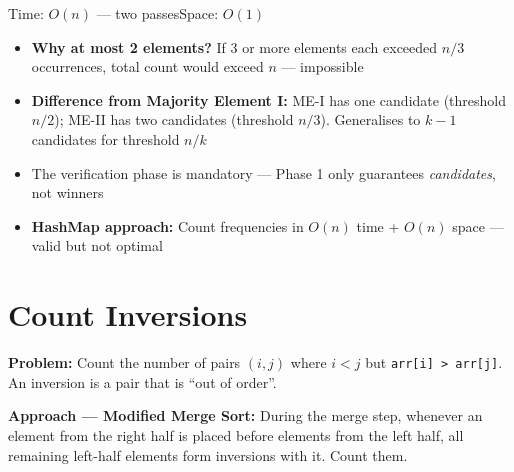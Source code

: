 \documentclass[12pt,a4paper,oneside]{book}
\begin{document}
\begin{complexity}
Time: $O(n)$ --- two passes\quad Space: $O(1)$
\end{complexity}

\begin{interviewcorner}
\begin{itemize}
  \item \textbf{Why at most 2 elements?} If 3 or more elements each exceeded $n/3$ occurrences, total count would exceed $n$ --- impossible
  \item \textbf{Difference from Majority Element I:} ME-I has one candidate (threshold $n/2$); ME-II has two candidates (threshold $n/3$). Generalises to $k-1$ candidates for threshold $n/k$
  \item The verification phase is mandatory --- Phase 1 only guarantees \textit{candidates}, not winners
  \item \textbf{HashMap approach:} Count frequencies in $O(n)$ time + $O(n)$ space --- valid but not optimal
\end{itemize}
\end{interviewcorner}

\section{Count Inversions}

\textbf{Problem:} Count the number of pairs $(i, j)$ where $i < j$ but \texttt{arr[i] > arr[j]}. An inversion is a pair that is ``out of order''.

\textbf{Approach --- Modified Merge Sort:} During the merge step, whenever an element from the right half is placed before elements from the left half, all remaining left-half elements form inversions with it. Count them.
\end{document}
